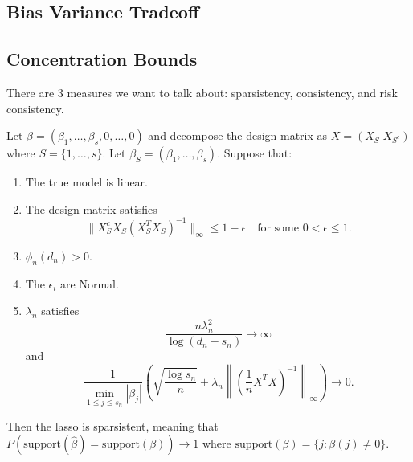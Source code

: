 \subsection{Bias Variance Tradeoff}

\subsection{Concentration Bounds}

  There are 3 measures we want to talk about: sparsistency, consistency, and risk consistency. 

  \begin{theorem}
    \label{thm:sparsistency-wainwright-2006}
    Let $\beta = (\beta_1, \ldots, \beta_s, 0, \ldots, 0)$ and decompose the design matrix as $X = (X_S \; X_{S^c})$ where $S = \{1, \ldots, s\}$. Let $\beta_S = (\beta_1, \ldots, \beta_s)$. Suppose that:
    \begin{enumerate}
      \item The true model is linear.
      
      \item The design matrix satisfies
      \begin{equation}
        \|X_S^c X_S (X_S^T X_S)^{-1}\|_{\infty} \leq 1 - \epsilon \quad \text{for some } 0 < \epsilon \leq 1. 
      \end{equation}
      
      \item $\phi_n(d_n) > 0$.
      
      \item The $\epsilon_i$ are Normal.
      
      \item $\lambda_n$ satisfies
      \begin{equation}
        \frac{n\lambda_n^2}{\log(d_n - s_n)} \to \infty
      \end{equation}
      and
      \begin{equation}
        \frac{1}{\min_{1 \leq j \leq s_n} |\beta_j|} \left( \sqrt{\frac{\log s_n}{n}} + \lambda_n \left\| \left( \frac{1}{n} X^T X \right)^{-1} \right\|_{\infty} \right) \to 0. 
      \end{equation}
    \end{enumerate}

    Then the lasso is sparsistent, meaning that $P(\text{support}(\hat{\beta}) = \text{support}(\beta)) \to 1$ where $\text{support}(\beta) = \{j : \beta(j) \neq 0\}$.
  \end{theorem}

